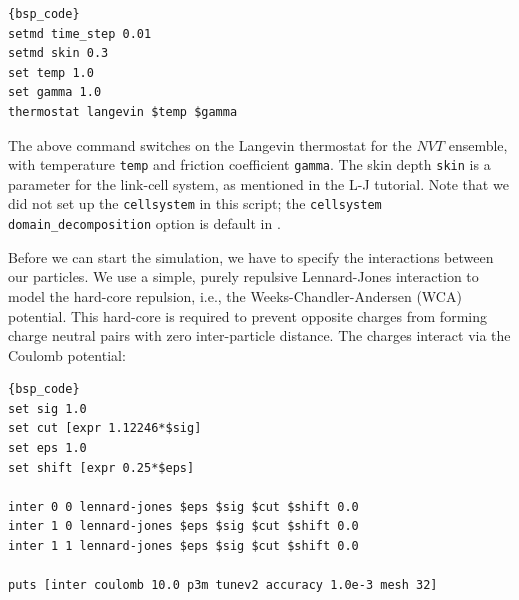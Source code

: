\documentclass[
a4paper,                        %
11pt,                           %
twoside,                        %
footsepline,                    %
headsepline,                    %
headexclude,                    %
footexclude,                    %
pagesize,                       %
]{scrartcl}
\newtheorem{task}{Task}
\begin{document}
{\small\vspace{0,2cm}
\begin{lstlisting}[firstnumber= auto]{bsp_code}
setmd time_step 0.01
setmd skin 0.3
set temp 1.0
set gamma 1.0
thermostat langevin $temp $gamma
\end{lstlisting}\vspace{0,2cm}
}

\noindent The above command switches on the Langevin thermostat for the $NVT$ ensemble, with temperature \verb|temp| and friction coefficient \verb|gamma|. The skin depth \verb|skin| is a parameter for the link-cell system, as mentioned in the L-J tutorial. Note that we did not set up the \verb|cellsystem| in this script; the \texttt{cellsystem domain\_decomposition} option is default in \es{}.

\vspace{1cm}
\vspace{1cm}

Before we can start the simulation, we have to specify the interactions between our particles. We use a simple, purely repulsive Lennard-Jones interaction to model the hard-core repulsion, i.e., the Weeks-Chandler-Andersen (WCA) potential. This hard-core is required to prevent opposite charges from forming charge neutral pairs with zero inter-particle distance. The charges interact via the Coulomb potential:

{\small\vspace{0,2cm}
\begin{lstlisting}[firstnumber= auto]{bsp_code}
set sig 1.0
set cut [expr 1.12246*$sig]
set eps 1.0
set shift [expr 0.25*$eps]

inter 0 0 lennard-jones $eps $sig $cut $shift 0.0
inter 1 0 lennard-jones $eps $sig $cut $shift 0.0
inter 1 1 lennard-jones $eps $sig $cut $shift 0.0

puts [inter coulomb 10.0 p3m tunev2 accuracy 1.0e-3 mesh 32]
\end{lstlisting}\vspace{0,2cm}
}
\end{document}

